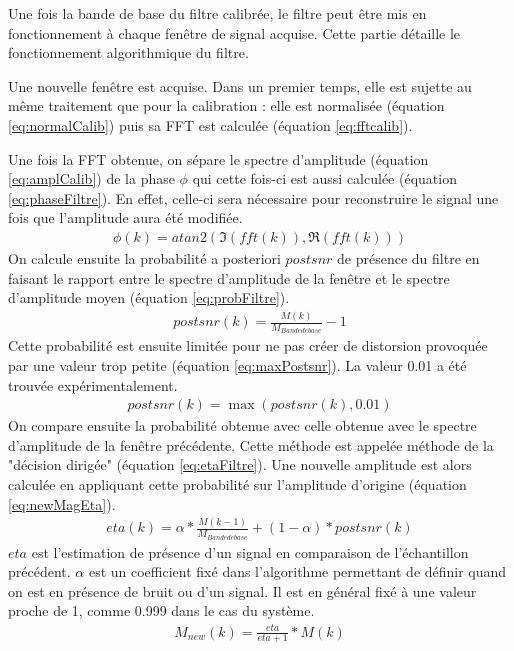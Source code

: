 \documentclass[letterpaper, twoside, 12pt, memoire, creativecommons, hyperref]{thETS}
\begin{document}
Une fois la bande de base du filtre calibrée, le filtre peut être mis en fonctionnement à chaque fenêtre de signal acquise. Cette partie détaille le fonctionnement algorithmique du filtre. 

Une nouvelle fenêtre est acquise. Dans un premier temps, elle est sujette au même traitement que pour la calibration : elle est normalisée (équation \ref{eq:normalCalib}) puis sa FFT est calculée (équation \ref{eq:fftcalib}).

Une fois la FFT obtenue, on sépare le spectre d'amplitude (équation \ref{eq:amplCalib}) de la phase $\phi$ qui cette fois-ci est aussi calculée (équation \ref{eq:phaseFiltre}). En effet, celle-ci sera nécessaire pour reconstruire le signal une fois que l'amplitude aura été modifiée.
\begin{align}\label{eq:phaseFiltre}
   \phi(k) = atan2(\Im(fft(k)), \Re(fft(k)))
\end{align}
On calcule ensuite la probabilité a posteriori $postsnr$ de présence du filtre en faisant le rapport entre le spectre d'amplitude de la fenêtre et le spectre d'amplitude moyen (équation \ref{eq:probFiltre}).
\begin{align}\label{eq:probFiltre}
   postsnr(k) = \frac{M(k)}{M_{Bande de base}} - 1
\end{align}
Cette probabilité est ensuite limitée pour ne pas créer de distorsion provoquée par une valeur trop petite (équation \ref{eq:maxPostsnr}). La valeur 0.01 a été trouvée expérimentalement.
\begin{align}\label{eq:maxPostsnr}
   postsnr(k) = \max(postsnr(k), 0.01)
\end{align}
On compare ensuite la probabilité obtenue avec celle obtenue avec le spectre d'amplitude de la fenêtre précédente. Cette méthode est appelée méthode de la "décision dirigée" (équation \ref{eq:etaFiltre}). Une nouvelle amplitude est alors calculée en appliquant cette probabilité sur l'amplitude d'origine (équation \ref{eq:newMagEta}).
\begin{align}\label{eq:etaFiltre}
   eta(k) = \alpha * \frac{M(k-1)}{M_{Bande de base}} + (1 - \alpha) * postsnr(k)
\end{align}
$eta$ est l'estimation de présence d'un signal en comparaison de l'échantillon précédent. $\alpha$ est un coefficient fixé dans l'algorithme permettant de définir quand on est en présence de bruit ou d'un signal. Il est en général fixé à une valeur proche de 1, comme 0.999 dans le cas du système.
\begin{align}\label{eq:newMagEta}
   M_{new}(k) = \frac{eta}{eta+1} * M(k)
\end{align}
\end{document}
